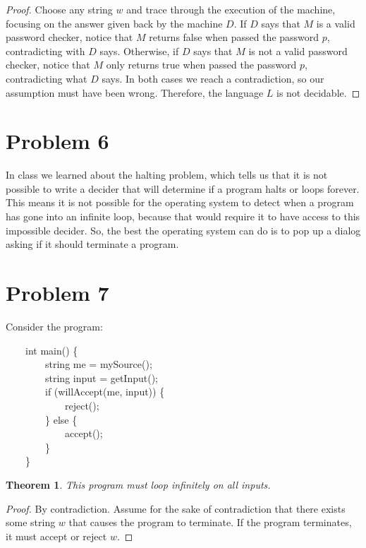 \documentclass[10pt,letter]{article}
\newtheorem*{thm}{Theorem}
\begin{document}
{\begin{proof}
Choose any string $w$ and trace through the execution of the machine, focusing on the answer given back by the machine $D$. If $D$ says that $M$ is a valid password checker, notice that $M$ returns false when passed the password $p$, contradicting with $D$ says. Otherwise, if $D$ says that $M$ is not a valid password checker, notice that $M$ only returns true when passed the password $p$, contradicting what $D$ says. In both cases we reach a contradiction, so our assumption must have been wrong. Therefore, the language $L$ is not decidable.
\end{proof}

\section*{Problem 6}
In class we learned about the halting problem, which tells us that it is not possible to write a decider that will determine if a program halts or loops forever. This means it is not possible for the operating system to detect when a program has gone into an infinite loop, because that would require it to have access to this impossible decider. So, the best the operating system can do is to pop up a dialog asking if it should terminate a program. 

\section*{Problem 7}

Consider the program:
{\selectfont

$\qquad$int main() \{\\
$\qquad$$\qquad$string me = mySource();\\
$\qquad$$\qquad$string input = getInput();\\
$\qquad$$\qquad$if (willAccept(me, input)) \{\\
$\qquad$$\qquad$$\qquad$reject();\\
$\qquad$$\qquad$\} else \{\\
$\qquad$$\qquad$$\qquad$accept();\\
$\qquad$$\qquad$\}\\
$\qquad$\}
}
\begin{thm}This program must loop infinitely on all inputs.\end{thm}
\begin{proof}
By contradiction. Assume for the sake of contradiction that there exists some string $w$ that causes the program to terminate. If the program terminates, it must accept or reject $w$. 


\end{proof}}
\end{document}
